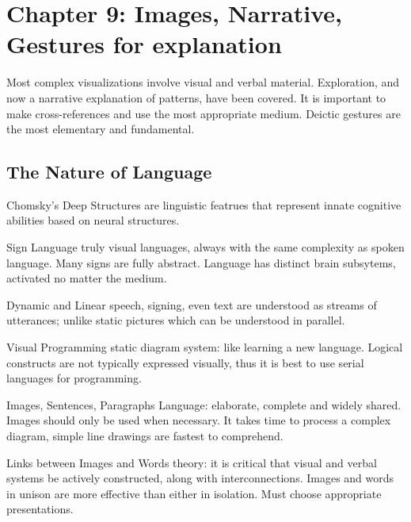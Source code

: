 \section{Chapter 9: Images, Narrative, Gestures for explanation}
\graphicspath{ {pngs/ch9/} }


\secttoc

Most complex visualizations involve visual and verbal material.
Exploration, and now a narrative explanation of patterns, have been covered.
It is important to make cross-references and use the most appropriate medium.
Deictic gestures are the most elementary and fundamental.

\begin{mdframed}\begin{multicols}{2}
\subsection{The Nature of Language}
\begin{compactdesc}
\item[Chomsky's Deep Structures] are linguistic featrues that represent innate
    cognitive abilities based on neural structures.
\item[Sign Language] truly visual languages, always with the same complexity as
    spoken language. Many signs are fully abstract. Language has distinct brain
    subsytems, activated no matter the medium.
\item[Dynamic and Linear] speech, signing, even text are understood as streams
    of utterances; unlike static pictures which can be understood in parallel.
\item[Visual Programming] static diagram system: like learning a new language.
    Logical constructs are not typically expressed visually, thus it is
    best to use serial languages for programming.
\item[Images, Sentences, Paragraphs] Language: elaborate, complete and widely
    shared. Images should only be used when necessary. It takes time to
    process a complex diagram, simple line drawings are fastest to comprehend.
\item[Links between Images and Words] theory: it is critical that visual and
    verbal systems be actively constructed, along with interconnections.
    Images and words in unison are more effective than either in isolation.
    Must choose appropriate presentations.
\end{compactdesc}


\end{multicols}
\end{mdframed}
